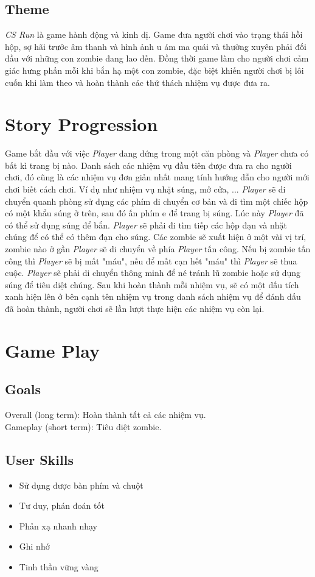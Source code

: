 \documentclass[14pt,a4paper]{extreport}
\begin{document}
\section{Theme}
\textit{CS Run} là game hành động và kinh dị. Game đưa người chơi vào trạng thái hồi hộp, sợ hãi trước âm thanh và hình ảnh u ám ma quái và thường xuyên phải đối đầu với những con zombie đang lao đến. Đồng thời game làm cho người chơi cảm giác hưng phấn mỗi khi bắn hạ một con zombie, đặc biệt khiến người chơi bị lôi cuốn khi làm theo và hoàn thành các thử thách nhiệm vụ được đưa ra.


\chapter{Story Progression}
Game bắt đầu với việc \textit{Player} đang đứng trong một căn phòng và \textit{Player} chưa có bất kì trang bị nào. Danh sách các nhiệm vụ đầu tiên được đưa ra cho người chơi, đó cũng là các nhiệm vụ đơn giản nhất mang tính hướng dẫn cho người mới chơi biết cách chơi. Ví dụ như nhiệm vụ nhặt súng, mở cửa, ... \textit{Player} sẽ di chuyển quanh phòng sử dụng các phím di chuyển cơ bản và đi tìm một chiếc hộp có một khẩu súng ở trên, sau đó ấn phím e để trang bị súng. Lúc này \textit{Player} đã có thể sử dụng súng để bắn. \textit{Player} sẽ phải đi tìm tiếp các hộp đạn và nhặt chúng để có thể có thêm đạn cho súng. Các zombie sẽ xuất hiện ở một vài vị trí, zombie nào ở gần \textit{Player} sẽ di chuyển về phía \textit{Player} tấn công. Nếu bị zombie tấn công thì \textit{Player} sẽ bị mất "máu", nếu để mất cạn hết "máu" thì \textit{Player} sẽ thua cuộc. \textit{Player} sẽ phải di chuyển thông minh để né tránh lũ zombie hoặc sử dụng súng để tiêu diệt chúng. Sau khi hoàn thành mỗi nhiệm vụ, sẽ có một dấu tích xanh hiện lên ở bên cạnh tên nhiệm vụ trong danh sách nhiệm vụ để đánh dấu đã hoàn thành, người chơi sẽ lần lượt thực hiện các nhiệm vụ còn lại.

\chapter{Game Play}
\section{Goals}
Overall (long term): Hoàn thành tất cả các nhiệm vụ. \\
Gameplay (short term): Tiêu diệt zombie.

\section{User Skills}
\begin{itemize}
	\item Sử dụng được bàn phím và chuột
	\item Tư duy, phán đoán tốt
	\item Phản xạ nhanh nhạy
	\item Ghi nhớ
	\item Tinh thần vững vàng
\end{itemize}
\end{document}
